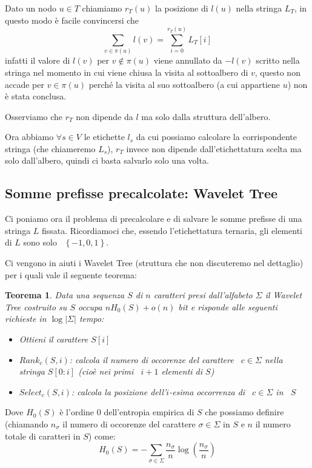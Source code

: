 \documentclass[a4paper,10pt]{amsbook}
\newcounter{counter1}
\theoremstyle{plain}
\newtheorem{myteo}[counter1]{Teorema}
\theoremstyle{definition}
\theoremstyle{remark}
\newcommand{\set}[1]{\left\{#1\right\}}
\newcommand{\pa}[1]{\left(#1\right)}
\newcommand{\abs}[1]{\left|#1\right|}
\begin{document}
Dato un nodo $u\in T$ chiamiamo $r_T(u)$ la posizione di $l(u)$ nella
stringa $L_T$, in questo modo \`e facile convincersi che 
\[ \sum _{v \in \pi(u)} l(v) = \sum _{i=0} ^
{r_T(u)} L_T[i] \]
infatti il valore di $l(v)$ per $v \not\in \pi(u)$ viene annullato da
$-l(v)$ scritto nella stringa nel momento in cui viene chiusa la
visita al sottoalbero di $v$, questo non accade per $v\in \pi(u)$
perch\'e la visita al suo sottoalbero (a cui appartiene $u$) non \`e
stata conclusa.

Osserviamo che $r_T$ non dipende da $l$ ma solo dalla struttura
dell'albero.

Ora abbiamo $\forall s\in V$ le etichette $l_s$ da cui possiamo
calcolare la corrispondente stringa (che chiameremo $L_s$), $r_T$
invece non dipende dall'etichettatura scelta ma solo dall'albero,
quindi ci basta salvarlo solo una volta.

\subsection{Somme prefisse precalcolate: Wavelet Tree}

Ci poniamo ora il problema di precalcolare e di salvare le somme
prefisse di una stringa $L$ fissata. Ricordiamoci che, essendo
l'etichettatura ternaria, gli elementi di $L$ sono solo~ $\set{-1, 0,
  1}$.

Ci vengono in aiuti i Wavelet Tree (struttura che non discuteremo nel
dettaglio) per i quali vale il seguente teorema:
\begin{myteo}
  Data una sequenza $S$ di $n$ caratteri presi dall'alfabeto $\Sigma$
  il Wavelet Tree costruito su $S$ occupa $nH_0(S) + o(n)$ bit e
  risponde alle seguenti richieste in $\log \abs{\Sigma}$ tempo:
  \begin{itemize}
  \item Ottieni il carattere $S[i]$
  \item $Rank_c (S,i)$: calcola il numero di occorenze del carattere~
    $c\in \Sigma$ nella stringa $S[0:i]$ (cio\`e nei primi~ $i+1$
    elementi di $S$)
  \item $Select _c (S,i)$: calcola la posizione dell'$i$-esima
    occorrenza di~ $c\in \Sigma$ in~ $S$
  \end{itemize}
\end{myteo}

Dove $H_0(S)$ \`e l'ordine $0$ dell'entropia empirica di $S$ che
possiamo definire (chiamando $n_\sigma$ il numero di occorenze del
carattere $\sigma\in \Sigma$ in $S$ e $n$ il numero totale di
caratteri in $S$) come:
\[ H_0(S) = - \sum _{\sigma \in \Sigma} \frac{n_\sigma}{n} \log \pa{
  \frac{n_\sigma}{n}} \] 
\end{document}
